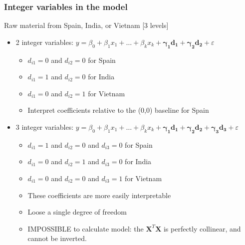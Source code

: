 \begin{frame}\frametitle{Integer variables in the model}

	Raw material from Spain, India, or Vietnam [3 levels]
	\begin{itemize}
		\item	2 integer variables: $y = \beta_0 + \beta_1x_1 + \ldots + \beta_k x_k +\mathbf{ \gamma_1 d_1 + \gamma_2 d_2} + \varepsilon$
		\begin{itemize}
			\item	$d_{i1} = 0$ and $d_{i2} = 0$ for Spain
			\item	$d_{i1} = 1$ and $d_{i2} = 0$ for India
			\item	$d_{i1} = 0$ and $d_{i2} = 1$ for Vietnam
			\item	Interpret coefficients relative to the (0,0) baseline for Spain
		\end{itemize}
	\end{itemize}
	\begin{itemize}
		\item	3 integer variables: $y = \beta_0 + \beta_1x_1 + \ldots + \beta_k x_k + \mathbf{\gamma_1 d_1 + \gamma_2 d_2 + \gamma_3 d_3} + \varepsilon$
		\begin{itemize}
			\item	$d_{i1} = 1$ and $d_{i2} = 0$ and $d_{i3} = 0$ for Spain
			\item	$d_{i1} = 0$ and $d_{i2} = 1$ and $d_{i3} = 0$ for India
			\item	$d_{i1} = 0$ and $d_{i2} = 0$ and $d_{i3} = 1$ for Vietnam
			\item	These coefficients are more easily interpretable
			\item	Loose a single degree of freedom
			\item	IMPOSSIBLE to calculate model: the $\mathbf{X}^T\mathbf{X}$ is perfectly collinear, and cannot be inverted.
		\end{itemize}
	\end{itemize}
\end{frame}

